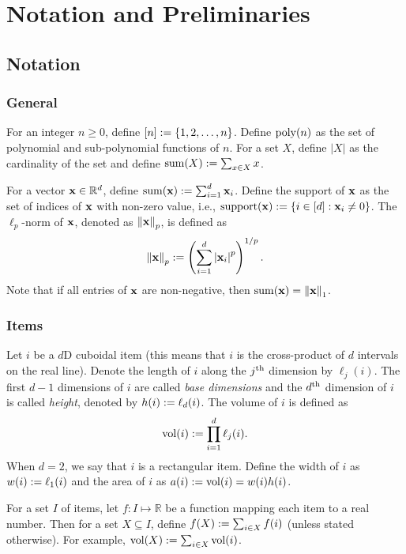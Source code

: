 \chapter{Notation and Preliminaries}
\label{chap:preliminaries}

\section{Notation}

\subsection{General}

For an integer $n \ge 0$, define $[n] := \{1, 2, \ldots, n\}$.
Define $\operatorname{poly}(n)$ as the set of polynomial and sub-polynomial functions of $n$.
For a set $X$, define $|X|$ as the cardinality of the set
and define $\operatorname{sum}(X) := \sum_{x \in X} x$.

For a vector $\mathbf{x} \in \mathbb{R}^d$, define $\operatorname{sum}(\mathbf{x}) := \sum_{i=1}^d \mathbf{x}_i$.
Define the support of $\mathbf{x}$ as the set of indices of $\mathbf{x}$ with non-zero value,
i.e., $\operatorname{support}(\mathbf{x}) := \{i \in [d]: \mathbf{x}_i \neq 0\}$.
The $\ell_p$-norm of $\mathbf{x}$, denoted as $\left\lVert \mathbf{x} \right\rVert_p$, is defined as
\[ \left\lVert \mathbf{x} \right\rVert_p := \left( \sum_{i=1}^d \left\lvert \mathbf{x}_i \right\rvert^p \right)^{1/p}. \]
Note that if all entries of $\mathbf{x}$ are non-negative, then $\operatorname{sum}(\mathbf{x}) = \left\lVert \mathbf{x} \right\rVert_1$.

\subsection{Items}

Let $i$ be a $d$D cuboidal item
(this means that $i$ is the cross-product of $d$ intervals on the real line).
Denote the length of $i$ along the $j^{\textrm{th}}$ dimension by $\ell_j(i)$.
The first $d-1$ dimensions of $i$ are called \emph{base dimensions}
and the $d^{\textrm{th}}$ dimension of $i$ is called \emph{height}, denoted by $h(i) := \ell_d(i)$.
The volume of $i$ is defined as
\[ \operatorname{vol}(i) := \prod_{i=1}^d \ell_j(i). \]
When $d=2$, we say that $i$ is a rectangular item.
Define the width of $i$ as $w(i) := \ell_1(i)$
and the area of $i$ as $a(i) := \operatorname{vol}(i) = w(i)h(i)$.

For a set $I$ of items, let $f: I \mapsto \mathbb{R}$ be a function
mapping each item to a real number.
Then for a set $X \subseteq I$, define $f(X) := \sum_{i \in X} f(i)$
(unless stated otherwise).
For example, $\operatorname{vol}(X) := \sum_{i \in X} \operatorname{vol}(i)$.

